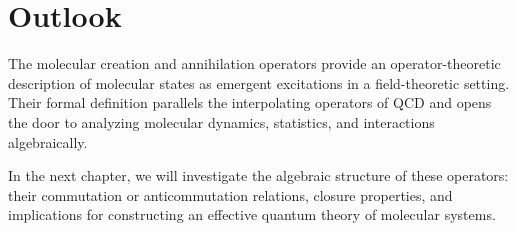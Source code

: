 \section{Outlook}

The molecular creation and annihilation operators provide an operator-theoretic description of molecular states as emergent excitations in a field-theoretic setting. Their formal definition parallels the interpolating operators of QCD and opens the door to analyzing molecular dynamics, statistics, and interactions algebraically.

In the next chapter, we will investigate the algebraic structure of these operators: their commutation or anticommutation relations, closure properties, and implications for constructing an effective quantum theory of molecular systems.

